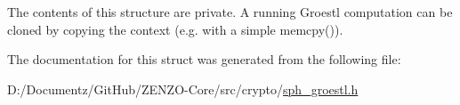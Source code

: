 The contents of this structure are private. A running Groestl computation can be cloned by copying the context (e.\+g. with a simple {\ttfamily memcpy()}). 

The documentation for this struct was generated from the following file\+:\begin{DoxyCompactItemize}
\item 
D\+:/\+Documentz/\+Git\+Hub/\+Z\+E\+N\+Z\+O-\/\+Core/src/crypto/\mbox{\hyperlink{sph__groestl_8h}{sph\+\_\+groestl.\+h}}\end{DoxyCompactItemize}
